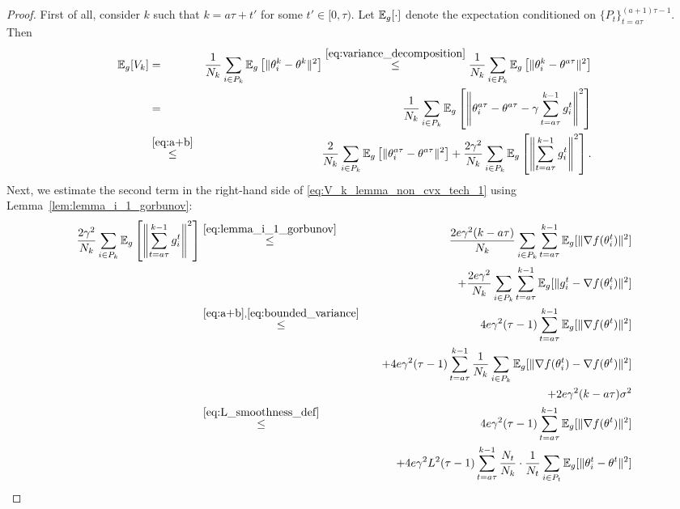 \begin{proof}
    First of all, consider $k$ such that $k = a\tau + t'$ for some $t'\in [0,\tau)$. Let $\mathbb{E}_g[\cdot]$ denote the expectation conditioned on $\{P_t\}_{t=a\tau}^{(a+1)\tau-1}$. Then
     \begin{eqnarray}
         \mathbb{E}_g[V_k] &=& \frac{1}{N_k}\sum\limits_{i\in P_k}\mathbb{E}_g\left[\|\theta_i^k - \theta^k\|^2\right] \overset{\eqref{eq:variance_decomposition}}{\le} \frac{1}{N_k}\sum\limits_{i\in P_k}\mathbb{E}_g\left[\|\theta_i^k - \theta^{a\tau}\|^2\right] \notag\\
         &=& \frac{1}{N_k}\sum\limits_{i\in P_k}\mathbb{E}_g\left[\left\|\theta_i^{a\tau} - \theta^{a\tau} - \gamma\sum\limits_{t=a\tau}^{k-1} g_i^t\right\|^2\right]\notag\\
         &\overset{\eqref{eq:a+b}}{\le}& \frac{2}{N_k} \sum\limits_{i\in P_k}\mathbb{E}_g\left[\|\theta_i^{a\tau} - \theta^{a\tau}\|^2\right] + \frac{2\gamma^2}{N_k}\sum\limits_{i\in P_k}\mathbb{E}_g\left[\left\|\sum\limits_{t=a\tau}^{k-1} g_i^t\right\|^2\right]. \label{eq:V_k_lemma_non_cvx_tech_1}
     \end{eqnarray}
     Next, we estimate the second term in the right-hand side of \eqref{eq:V_k_lemma_non_cvx_tech_1} using Lemma~\ref{lem:lemma_i_1_gorbunov}:
     \begin{eqnarray}
         \frac{2\gamma^2}{N_k}\sum\limits_{i\in P_k}\EE_g\left[\left\|\sum\limits_{t=a\tau}^{k-1} g_i^t\right\|^2\right] &\overset{\eqref{eq:lemma_i_1_gorbunov}}{\le}& \frac{2e\gamma^2(k - a\tau)}{N_k} \sum\limits_{i\in P_k} \sum\limits_{t=a\tau}^{k-1}\EE_g[\|\nabla f(\theta_i^t)\|^2]\notag\\
         &&\quad + \frac{2e\gamma^2}{N_k}\sum\limits_{i\in P_k} \sum\limits_{t=a\tau}^{k-1}\EE_g[\|g_i^t - \nabla f(\theta_i^t)\|^2]\notag\\
         &\overset{\eqref{eq:a+b},\eqref{eq:bounded_variance}}{\le}& 4e\gamma^2(\tau-1) \sum\limits_{t=a\tau}^{k-1}\EE_g[\|\nabla f(\theta^t)\|^2] \notag\\
         &&\quad+ 4e\gamma^2(\tau-1) \sum\limits_{t=a\tau}^{k-1}\frac{1}{N_k}\sum\limits_{i\in P_k}\EE_g[\|\nabla f(\theta_i^t) - \nabla f(\theta^t)\|^2] \notag\\
         &&\quad+ 2e\gamma^2 (k - a\tau)\sigma^2\notag\\
         &\overset{\eqref{eq:L_smoothness_def}}{\le}& 4e\gamma^2(\tau-1) \sum\limits_{t=a\tau}^{k-1}\EE_g[\|\nabla f(\theta^t)\|^2]\notag\\
         &&\quad + 4e\gamma^2L^2(\tau-1) \sum\limits_{t=a\tau}^{k-1}\frac{N_t}{N_k}\cdot\frac{1}{N_t}\sum\limits_{i\in P_t}\EE_g[\|\theta_i^t - \theta^t\|^2]\notag\\

\end{eqnarray}
\end{proof}
